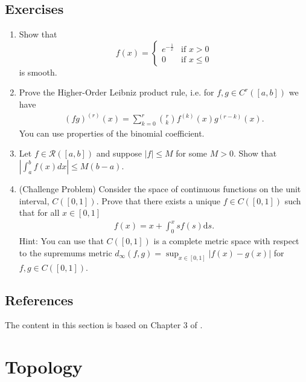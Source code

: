 \documentclass{article}
\begin{document}
\subsection{Exercises}
\begin{enumerate}
    \item Show that 
    \begin{equation*}
        f(x) = \begin{cases} e^{-\frac{1}{x}} & \text{if } x > 0 \\
        0 & \text{if } x \leq 0
        \end{cases}
    \end{equation*}
    is smooth.
    \item Prove the Higher-Order Leibniz product rule, i.e. for $f,g \in C^r([a,b])$ we have 
    \begin{align*}
        (fg)^{(r)}(x) = \sum_{k=0}^r \binom{r}{k} f^{(k)}(x) g^{(r-k)}(x).
    \end{align*}
    You can use properties of the binomial coefficient.
    \item Let $f \in \mathcal{R}([a,b])$ and suppose $|f| \leq M$ for some $M > 0$. Show that $|\int_a^b f(x) dx| \leq M(b-a)$.
    \item (Challenge Problem) Consider the space of continuous functions on the unit interval, $C([0,1])$. Prove that there exists a unique $f\in C([0,1])$ such that for all $x\in [0,1]$
    \begin{align*}
        f(x) = x + \int_0^x sf(s) \mathrm{d}s.
    \end{align*}
    Hint: You can use that $C([0,1])$ is a complete metric space with respect to the supremums metric $d_\infty (f,g) = \sup_{x\in [0,1]} \vert f(x) -g(x)\vert$ for $f,g \in C([0,1])$.
\end{enumerate}

\subsection{References}
The content in this section is based on Chapter 3 of \cite{realanalysis}.



\newpage
{}
\printbibliography

\newpage
\appendix

\section{Topology}
\label{app:topology}
\end{document}
